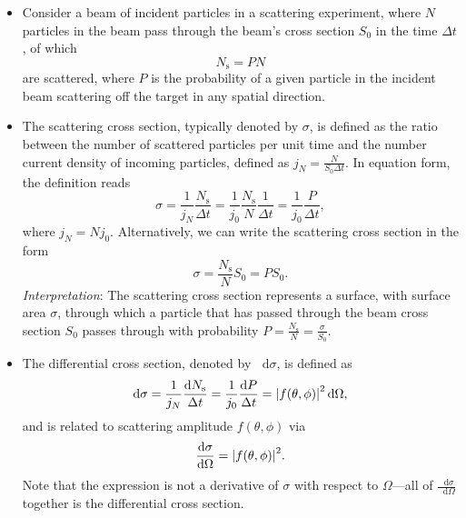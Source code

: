 \documentclass[11pt, a4paper]{article}
\newcommand{\diff}{\mathop{}\!\mathrm{d}} %
\begin{document}
\begin{itemize}
    \item Consider a beam of incident particles in a scattering experiment, where $ N $ particles in the beam pass through the beam's cross section $ S_{0} $ in the time $ \Delta t $, of which 
    \begin{equation*}
        N_{\text{s}} = P N
    \end{equation*}
    are scattered, where $ P $ is the probability of a given particle in the incident beam scattering off the target in any spatial direction. 
    
    \item The scattering cross section, typically denoted by $ \sigma $, is defined as the ratio between the number of scattered particles per unit time and the number current density of incoming particles, defined as $ j_{N} = \frac{N}{S_{0}\Delta t}$. In equation form, the definition reads
    \begin{equation*}
        \sigma = \frac{1}{j_{N}}  \frac{N_{\text{s}}}{\Delta t} = \frac{1}{j_{0}} \frac{N_{\text{s}}}{N} \frac{1}{\Delta t} = \frac{1}{j_{0}} \frac{P}{\Delta t},
    \end{equation*}
    where $ j_{N} = N j_{0} $. Alternatively, we can write the scattering cross section in the form
    \begin{equation*}
        \sigma = \frac{N_{\text{s}}}{N}S_{0} = P S_{0}.
    \end{equation*}
    \textit{Interpretation}: The scattering cross section represents a surface, with surface area $ \sigma $, through which a particle that has passed through the beam cross section $ S_{0} $ passes through with probability $ P = \frac{N_{\text{s}}}{N} = \frac{\sigma}{S_{0}}$.
    
    \item The differential cross section, denoted by $ \diff \sigma $, is defined as
    \begin{equation*}
        \diff \sigma = \frac{1}{j_{N}} \frac{\diff N_{\text{s}}}{\Delta t} = \frac{1}{j_{0}} \frac{\diff P}{\Delta t} = \abs{f(\theta, \phi)}^{2} \diff \Omega,
    \end{equation*}
    and is related to scattering amplitude $ f(\theta, \phi) $ via
    \begin{equation*}
        \frac{\diff \sigma}{\diff \Omega} = \abs{f(\theta, \phi)}^{2}.
    \end{equation*}
    Note that the expression is not a derivative of $ \sigma $ with respect to $ \Omega $---all of $ \frac{\diff \sigma}{\diff \Omega}  $ together is the differential cross section. 


\end{itemize}
\end{document}
